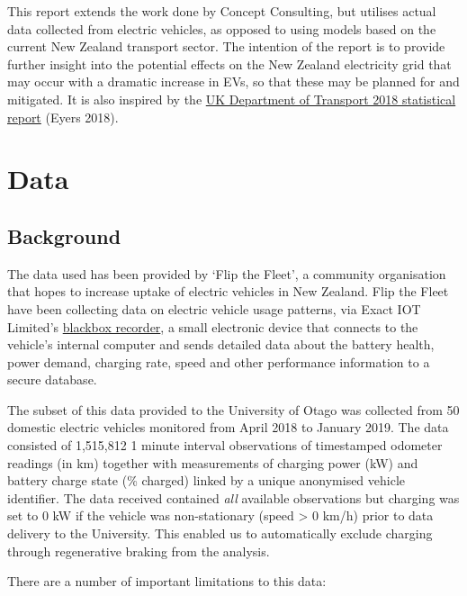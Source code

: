 \documentclass[]{article}
\begin{document}
This report extends the work done by Concept Consulting, but utilises actual data collected from electric vehicles, as opposed to using models based on the current New Zealand transport sector. The intention of the report is to provide further insight into the potential effects on the New Zealand electricity grid that may occur with a dramatic increase in EVs, so that these may be planned for and mitigated. It is also inspired by the \href{https://assets.publishing.service.gov.uk/government/uploads/system/uploads/attachment_data/file/764270/electric-chargepoint-analysis-2017-domestics.pdf}{UK Department of Transport 2018 statistical report} (Eyers 2018).

\hypertarget{data}{%
\section{Data}\label{data}}

\hypertarget{background}{%
\subsection{Background}\label{background}}

The data used has been provided by `Flip the Fleet', a community organisation that hopes to increase uptake of electric vehicles in New Zealand. Flip the Fleet have been collecting data on electric vehicle usage patterns, via Exact IOT Limited's \href{https://flipthefleet.org/ev-black-box/}{blackbox recorder}, a small electronic device that connects to the vehicle's internal computer and sends detailed data about the battery health, power demand, charging rate, speed and other performance information to a secure database.

The subset of this data provided to the University of Otago was collected from 50 domestic electric vehicles monitored from April 2018 to January 2019. The data consisted of 1,515,812 1 minute interval observations of timestamped odometer readings (in km) together with measurements of charging power (kW) and battery charge state (\% charged) linked by a unique anonymised vehicle identifier. The data received contained \emph{all} available observations but charging was set to 0 kW if the vehicle was non-stationary (speed \textgreater{} 0 km/h) prior to data delivery to the University. This enabled us to automatically exclude charging through regenerative braking from the analysis.

There are a number of important limitations to this data:
\end{document}
